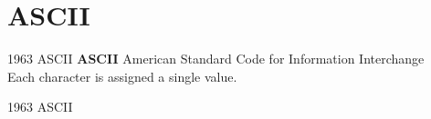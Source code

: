 \documentclass[../index.tex]{subfiles}
\begin{document}
\renewcommand{\sectiontitle}{ASCII}
\section{\sectiontitle}
%

\renewcommand{\currenttitle}{1963 \textendash{} ASCII}
\begin{frame}{\currenttitle}
%
  \textbf{ASCII} \textendash{} American Standard Code for Information Interchange \\
  \vspace*{1em}
  Each character is assigned a single value.
\end{frame}

\begin{frame}{\currenttitle}
%
%
%
%
  \vspace*{1em}

  \scriptsize
  
  \normalsize
\end{frame}
\end{document}
